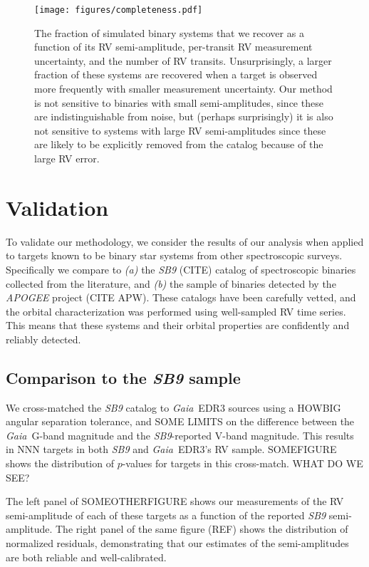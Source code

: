 \documentclass[modern, letterpaper]{aastex631}
\newcommand{\project}[1]{\textsl{#1}}
\newcommand{\Gaia}{\project{Gaia}}
\begin{document}
\begin{figure}
	\begin{centering}
		\texttt{[image: figures/completeness.pdf]}
		\caption{The fraction of simulated binary systems that we recover as a function of its RV semi-amplitude, per-transit RV measurement uncertainty, and the number of RV transits. Unsurprisingly, a larger fraction of these systems are recovered when a target is observed more frequently with smaller measurement uncertainty. Our method is not sensitive to binaries with small semi-amplitudes, since these are indistinguishable from noise, but (perhaps surprisingly) it is also not sensitive to systems with large RV semi-amplitudes since these are likely to be explicitly removed from the catalog because of the large RV error.}
		\label{fig:completeness}
	\end{centering}
\end{figure}

\section{Validation}

To validate our methodology, we consider the results of our analysis when applied to targets known to be binary star systems from other spectroscopic surveys.
Specifically we compare to \emph{(a)} the \project{SB9} (CITE) catalog of spectroscopic binaries collected from the literature, and \emph{(b)} the sample of binaries detected by the \project{APOGEE} project (CITE APW).
These catalogs have been carefully vetted, and the orbital characterization was performed using well-sampled RV time series.
This means that these systems and their orbital properties are confidently and reliably detected.

\subsection{Comparison to the \project{SB9} sample}

We cross-matched the \project{SB9} catalog to \Gaia\ EDR3 sources using a HOWBIG angular separation tolerance, and SOME LIMITS on the difference between the \Gaia\ G-band magnitude and the \project{SB9}-reported V-band magnitude.
This results in NNN targets in both \project{SB9} and \Gaia\ EDR3's RV sample.
SOMEFIGURE shows the distribution of $p$-values for targets in this cross-match.
WHAT DO WE SEE?

The left panel of SOMEOTHERFIGURE shows our measurements of the RV semi-amplitude of each of these targets as a function of the reported \project{SB9} semi-amplitude.
The right panel of the same figure (REF) shows the distribution of normalized residuals, demonstrating that our estimates of the semi-amplitudes are both reliable and well-calibrated.
\end{document}
